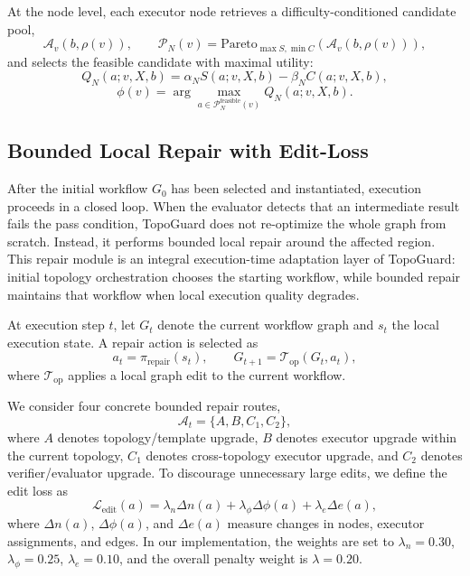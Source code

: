 \documentclass[acmsmall,review,anonymous]{acmart}
\begin{document}
At the node level, each executor node retrieves a difficulty-conditioned candidate pool,
\begin{equation}
\mathcal{A}_v(b,\rho(v)),
\qquad
\mathcal{P}_N(v)=\text{Pareto}_{\max S,\min C}(\mathcal{A}_v(b,\rho(v))),
\end{equation}
and selects the feasible candidate with maximal utility:
\begin{equation}
Q_N(a;v,X,b)=\alpha_N S(a;v,X,b)-\beta_N C(a;v,X,b),
\end{equation}
\begin{equation}
\phi(v)=\arg\max_{a\in\mathcal{P}_N^{\text{feasible}}(v)}Q_N(a;v,X,b).
\end{equation}

\subsection{Bounded Local Repair with Edit-Loss}
\label{sec:repair}

After the initial workflow $G_0$ has been selected and instantiated, execution proceeds in a closed loop.
When the evaluator detects that an intermediate result fails the pass condition, TopoGuard does not re-optimize the whole graph from scratch.
Instead, it performs bounded local repair around the affected region.
This repair module is an integral execution-time adaptation layer of TopoGuard: initial topology orchestration chooses the starting workflow, while bounded repair maintains that workflow when local execution quality degrades.

At execution step $t$, let $G_t$ denote the current workflow graph and $s_t$ the local execution state.
A repair action is selected as
\begin{equation}
a_t=\pi_{\mathrm{repair}}(s_t),
\qquad
G_{t+1}=\mathcal{T}_{\mathrm{op}}(G_t,a_t),
\label{eq:repair_transition}
\end{equation}
where $\mathcal{T}_{\mathrm{op}}$ applies a local graph edit to the current workflow.

We consider four concrete bounded repair routes,
\begin{equation}
\mathcal{A}_t=\{A,B,C_1,C_2\},
\end{equation}
where $A$ denotes topology/template upgrade, $B$ denotes executor upgrade within the current topology, $C_1$ denotes cross-topology executor upgrade, and $C_2$ denotes verifier/evaluator upgrade.
To discourage unnecessary large edits, we define the edit loss as
\begin{equation}
\mathcal{L}_{\mathrm{edit}}(a)
=
\lambda_n\Delta n(a)+\lambda_\phi\Delta\phi(a)+\lambda_e\Delta e(a),
\label{eq:edit_loss}
\end{equation}
where $\Delta n(a)$, $\Delta\phi(a)$, and $\Delta e(a)$ measure changes in nodes, executor assignments, and edges.
In our implementation, the weights are set to $\lambda_n=0.30$, $\lambda_\phi=0.25$, $\lambda_e=0.10$, and the overall penalty weight is $\lambda=0.20$.
\end{document}
